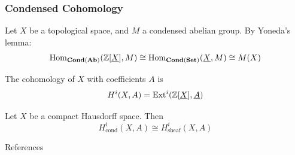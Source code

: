 \documentclass{beamer}
\begin{document}
\begin{frame}
    \frametitle{Condensed Cohomology}
    Let $X$ be a topological space, and $M$ a condensed abelian group.
    By Yoneda's lemma:
    \begin{equation*}
        \operatorname{Hom}_{\mathbf{Cond}(\operatorname{\mathbf{Ab}})}(\mathbb{Z}[\underline{X}], M) \cong
        \operatorname{Hom}_{\mathbf{Cond}(\operatorname{\mathbf{Set}})}(\underline{X}, M) \cong M(X)
    \end{equation*}
    \pause
    \begin{definition}
        The cohomology of $X$ with coefficients $A$ is
        \begin{equation*}
            H^i (X, A) = \operatorname{Ext}^i(\mathbb{Z}[\underline{X}], \underline{A})
        \end{equation*}
    \end{definition}
    \pause
    \begin{theorem}
        Let $X$ be a compact Hausdorff space. Then
        \begin{equation*}
            H^i_{\text{cond}}(X, A) \cong H^i_{\text{sheaf}}(X, A)
        \end{equation*}
    \end{theorem}

\end{frame}


\begin{frame}{References}
    \nocite{Sch2019LecturesCM}
    \nocite{Apa2021condensed}
    \nocite{stacks-project}
    \nocite{Sch2020MasterClass}
    
\end{frame}
\end{document}
